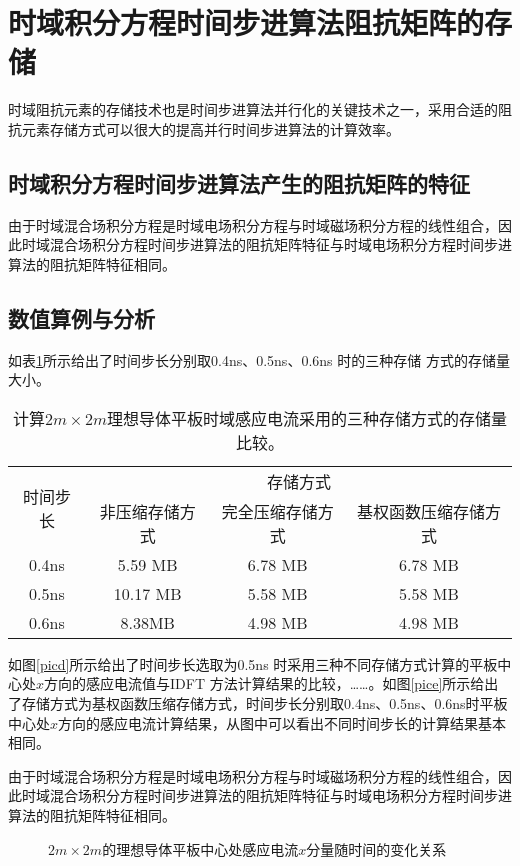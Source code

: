 \documentclass[bachelor]{thesis-uestc}
\begin{document}
\section{时域积分方程时间步进算法阻抗矩阵的存储}
时域阻抗元素的存储技术也是时间步进算法并行化的关键技术之一，采用合适的阻抗元素存储方式可以很大的提高并行时间步进算法的计算效率。

\subsection{时域积分方程时间步进算法产生的阻抗矩阵的特征}
由于时域混合场积分方程是时域电场积分方程与时域磁场积分方程的线性组合，因此时域混合场积分方程时间步进算法的阻抗矩阵特征与时域电场积分方程时间步进算法的阻抗矩阵特征相同。

\subsection{数值算例与分析}
如表\ref{tablea}所示给出了时间步长分别取0.4ns、0.5ns、0.6ns 时的三种存储
方式的存储量大小。

\begin{table}[h]
\caption{计算$2m\times 2m$理想导体平板时域感应电流采用的三种存储方式的存储量比较。}
\begin{tabular}{cccc}
\toprule
\multirow{2}{*}{时间步长} & \multicolumn{3}{c}{存储方式} \\
\cmidrule{2-4}
& 非压缩存储方式 & 完全压缩存储方式 & 基权函数压缩存储方式 \\
\midrule
0.4ns & 5.59 MB & 6.78 MB & 6.78 MB\\
0.5ns & 10.17 MB & 5.58 MB & 5.58 MB \\
0.6ns & 8.38MB & 4.98 MB & 4.98 MB \\
\bottomrule
\end{tabular}
\label{tablea}
\end{table}

如图\ref{picd}所示给出了时间步长选取为0.5ns 时采用三种不同存储方式计算的平板中心处$x$方向的感应电流值与IDFT 方法计算结果的比较，……。如图\ref{pice}所示给出了存储方式为基权函数压缩存储方式，时间步长分别取0.4ns、0.5ns、0.6ns时平板中心处$x$方向的感应电流计算结果，从图中可以看出不同时间步长的计算结果基本相同。

由于时域混合场积分方程是时域电场积分方程与时域磁场积分方程的线性组合，因此时域混合场积分方程时间步进算法的阻抗矩阵特征与时域电场积分方程时间步进算法的阻抗矩阵特征相同。

\begin{figure}[h]
\caption{$2m\times 2m$的理想导体平板中心处感应电流$x$分量随时间的变化关系}
\label{fig2}
\end{figure}
\end{document}
